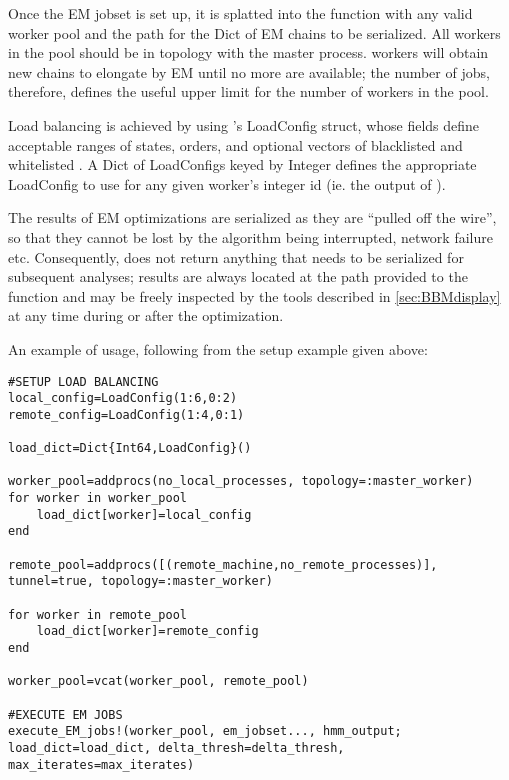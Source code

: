 Once the EM jobset is set up, it is splatted into the  function with any valid worker pool and the path for the Dict of EM chains to be serialized. All workers in the pool should be in  topology with the master process.  workers will obtain new chains to elongate by EM until no more are available; the number of jobs, therefore, defines the useful upper limit for the number of workers in the pool.

Load balancing is achieved by using 's LoadConfig struct, whose fields define acceptable ranges of states, orders, and optional vectors of blacklisted and whitelisted . A Dict of LoadConfigs keyed by Integer defines the appropriate LoadConfig to use for any given worker's integer id (ie. the output of ).

The results of EM optimizations are serialized as they are ``pulled off the wire'', so that they cannot be lost by the algorithm being interrupted, network failure etc. Consequently,  does not return anything that needs to be serialized for subsequent analyses; results are always located at the path provided to the function and may be freely inspected by the tools described in \autoref{sec:BBMdisplay} at any time during or after the optimization.

An example of  usage, following from the setup example given above:

\begin{verbatim}
#SETUP LOAD BALANCING
local_config=LoadConfig(1:6,0:2)
remote_config=LoadConfig(1:4,0:1)

load_dict=Dict{Int64,LoadConfig}()

worker_pool=addprocs(no_local_processes, topology=:master_worker)
for worker in worker_pool
    load_dict[worker]=local_config
end

remote_pool=addprocs([(remote_machine,no_remote_processes)], tunnel=true, topology=:master_worker)

for worker in remote_pool
    load_dict[worker]=remote_config
end

worker_pool=vcat(worker_pool, remote_pool)

#EXECUTE EM JOBS
execute_EM_jobs!(worker_pool, em_jobset..., hmm_output; load_dict=load_dict, delta_thresh=delta_thresh, max_iterates=max_iterates)
\end{verbatim}

